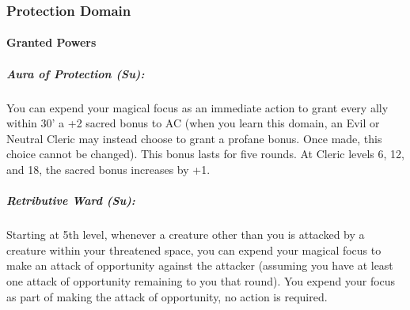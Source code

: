 \subsubsection{Protection Domain}
\paragraph{Granted Powers}
\subparagraph{Aura of Protection (Su):}
You can expend your magical focus as an immediate action to grant every ally within 30' a +2 sacred bonus to AC (when you learn this domain, an Evil or Neutral Cleric may instead choose to grant a profane bonus. Once made, this choice cannot be changed).
This bonus lasts for five rounds.
At Cleric levels 6, 12, and 18, the sacred bonus increases by +1.
\subparagraph{Retributive Ward (Su):}
Starting at 5th level, whenever a creature other than you is attacked by a creature within your threatened space, you can expend your magical focus to make an attack of opportunity against the attacker (assuming you have at least one attack of opportunity remaining to you that round).
You expend your focus as part of making the attack of opportunity, no action is required.
